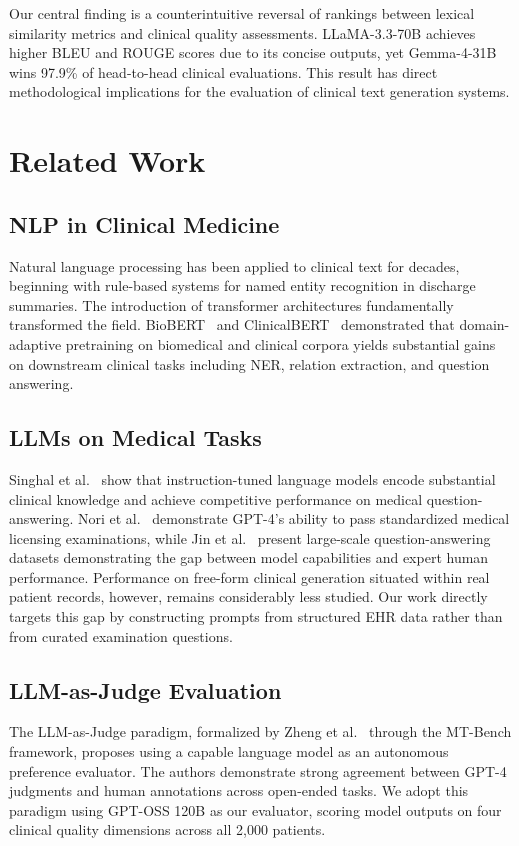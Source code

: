 \documentclass[10pt, twocolumn, a4paper]{article}
\begin{document}
Our central finding is a counterintuitive reversal of rankings between lexical similarity metrics and clinical quality assessments. LLaMA-3.3-70B achieves higher BLEU and ROUGE scores due to its concise outputs, yet Gemma-4-31B wins 97.9\% of head-to-head clinical evaluations. This result has direct methodological implications for the evaluation of clinical text generation systems.

\section{Related Work}

\subsection{NLP in Clinical Medicine}
Natural language processing has been applied to clinical text for decades, beginning with rule-based systems for named entity recognition in discharge summaries. The introduction of transformer architectures fundamentally transformed the field. BioBERT~\cite{biobert} and ClinicalBERT~\cite{clinicalbert} demonstrated that domain-adaptive pretraining on biomedical and clinical corpora yields substantial gains on downstream clinical tasks including NER, relation extraction, and question answering.

\subsection{LLMs on Medical Tasks}
Singhal et al.~\cite{llmclinical} show that instruction-tuned language models encode substantial clinical knowledge and achieve competitive performance on medical question-answering. Nori et al.~\cite{gpt4med} demonstrate GPT-4's ability to pass standardized medical licensing examinations, while Jin et al.~\cite{medqa} present large-scale question-answering datasets demonstrating the gap between model capabilities and expert human performance. Performance on free-form clinical generation situated within real patient records, however, remains considerably less studied. Our work directly targets this gap by constructing prompts from structured EHR data rather than from curated examination questions.

\subsection{LLM-as-Judge Evaluation}
The LLM-as-Judge paradigm, formalized by Zheng et al.~\cite{llmjudge} through the MT-Bench framework, proposes using a capable language model as an autonomous preference evaluator. The authors demonstrate strong agreement between GPT-4 judgments and human annotations across open-ended tasks. We adopt this paradigm using GPT-OSS 120B as our evaluator, scoring model outputs on four clinical quality dimensions across all 2,000 patients.
\end{document}
